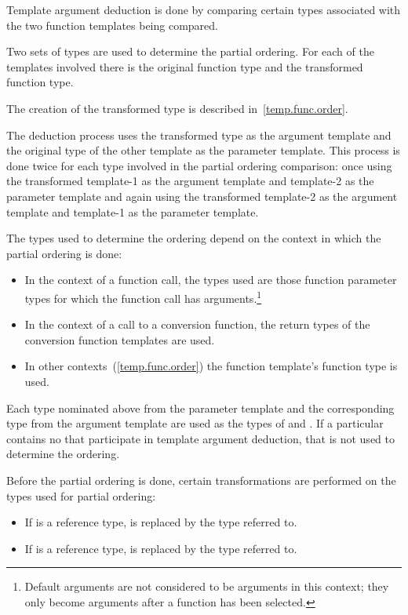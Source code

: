 \pnum
Template argument deduction is done by comparing certain types associated with
the two function templates being compared.

\pnum
Two sets of types are used to determine the partial ordering.  For each of
the templates involved there is the original function type and the
transformed function type.
\begin{note}
The creation of the transformed type is described in~\ref{temp.func.order}.
\end{note}
The deduction process uses the
transformed type as the argument template and the original type of the
other template as the parameter template.  This process is done twice
for each type involved in the partial ordering comparison: once using
the transformed template-1 as the argument template and template-2 as
the parameter template and again using the transformed template-2 as
the argument template and template-1 as the parameter template.

\pnum
The types used to determine the ordering depend on the context in which
the partial ordering is done:

\begin{itemize}
\item
In the context of a function call, the types used are those function parameter types
for which the function call has arguments.\footnote{Default arguments
are not considered to be arguments in this context; they only become arguments
after a function has been selected.}
\item
In the context of a call to a conversion function, the return types of
the conversion function templates are used.
\item
In other contexts~(\ref{temp.func.order}) the function template's function
type is used.
\end{itemize}

\pnum
Each type nominated above from the parameter template and the corresponding type from the
argument template are used as the types of
and
.
If a particular  contains no 
that participate in template argument deduction, that  is not
used to determine the ordering.

\pnum
Before the partial ordering is done, certain transformations are performed
on the types used for partial ordering:

\begin{itemize}
\item
If
is a reference type,
is replaced by the type referred to.
\item
If
is a reference type,
is replaced by the type referred to.
\end{itemize}


